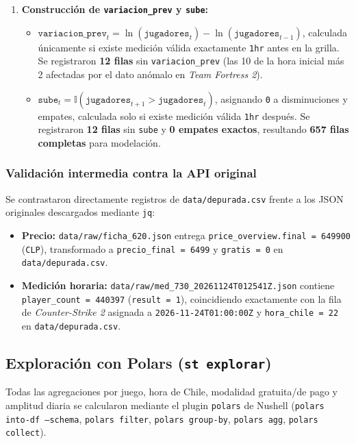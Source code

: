 \documentclass[11pt,a4paper]{article}
\begin{document}
\begin{enumerate}
    \item \textbf{Construcción de \texttt{variacion\_prev} y \texttt{sube}:}
    \begin{itemize}
        \item $\texttt{variacion\_prev}_t = \ln(\texttt{jugadores}_t) - \ln(\texttt{jugadores}_{t-1})$, calculada únicamente si existe medición válida exactamente \texttt{1hr} antes en la grilla. Se registraron \textbf{12 filas} sin \texttt{variacion\_prev} (las 10 de la hora inicial más 2 afectadas por el dato anómalo en \emph{Team Fortress 2}).
        \item $\texttt{sube}_t = \mathbb{I}(\texttt{jugadores}_{t+1} > \texttt{jugadores}_t)$, asignando \texttt{0} a disminuciones y empates, calculada solo si existe medición válida \texttt{1hr} después. Se registraron \textbf{12 filas} sin \texttt{sube} y \textbf{0 empates exactos}, resultando \textbf{657 filas completas} para modelación.
    \end{itemize}
\end{enumerate}

\subsubsection{Validación intermedia contra la API original}
Se contrastaron directamente registros de \texttt{data/depurada.csv} frente a los JSON originales descargados mediante \texttt{jq}:
\begin{itemize}
    \item \textbf{Precio:} \texttt{data/raw/ficha\_620.json} entrega \texttt{price\_overview.final = 649900} (\texttt{CLP}), transformado a \texttt{precio\_final = 6499} y \texttt{gratis = 0} en \texttt{data/depurada.csv}.
    \item \textbf{Medición horaria:} \texttt{data/raw/med\_730\_20261124T012541Z.json} contiene \texttt{player\_count = 440397} (\texttt{result = 1}), coincidiendo exactamente con la fila de \emph{Counter-Strike 2} asignada a \texttt{2026-11-24T01:00:00Z} y \texttt{hora\_chile = 22} en \texttt{data/depurada.csv}.
\end{itemize}

\subsection{Exploración con Polars (\texttt{st explorar})}

Todas las agregaciones por juego, hora de Chile, modalidad gratuita/de pago y amplitud diaria se calcularon mediante el plugin \texttt{polars} de Nushell (\texttt{polars into-df --schema}, \texttt{polars filter}, \texttt{polars group-by}, \texttt{polars agg}, \texttt{polars collect}).
\end{document}

